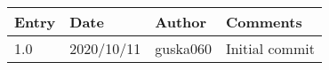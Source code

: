 \begin{tabular}{ |p{3cm}||p{3cm}|p{3cm}|p{3cm}|  }
 

 \hline
 Entry & Date & Author &Comments \\
 \hline
 1.0   & 2020/10/11    &guska060 &  Initial commit\\
 

 \hline
\end{tabular}